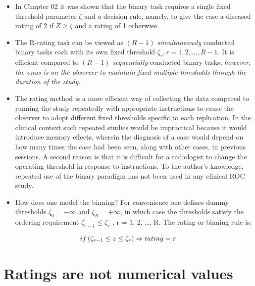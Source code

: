 \documentclass[
]{book}
\begin{document}
\begin{itemize}
\item
  In Chapter 02 it was shown that the binary task requires a single fixed threshold parameter \(\zeta\) and a decision rule, namely, to give the case a diseased rating of 2 if \(Z \ge \zeta\) and a rating of 1 otherwise.
\item
  The R-rating task can be viewed as \((R-1)\) \emph{simultaneously} conducted binary tasks each with its own fixed threshold \(\zeta_r, r = 1, 2, ..., R-1\). It is efficient compared to \((R-1)\) \emph{sequentially} conducted binary tasks; \emph{however, the onus is on the observer to maintain fixed-multiple thresholds through the duration of the study}.
\item
  The rating method is a more efficient way of collecting the data compared to running the study repeatedly with appropriate instructions to cause the observer to adopt different fixed thresholds specific to each replication. In the clinical context such repeated studies would be impractical because it would introduce memory effects, wherein the diagnosis of a case would depend on how many times the case had been seen, along with other cases, in previous sessions. A second reason is that it is difficult for a radiologist to change the operating threshold in response to instructions. To the author's knowledge, repeated use of the binary paradigm has not been used in any clinical ROC study.
\item
  How does one model the binning? For convenience one defines dummy thresholds \(\zeta_0 = - \infty\) and \(\zeta_R = + \infty\), in which case the thresholds satisfy the ordering requirement \(\zeta_{r-1} \le \zeta_r\) , r = 1, 2, \ldots, R. The rating or binning rule is:
\end{itemize}

\begin{equation*} 
if \left (\zeta_{r-1} \le z \le \zeta_r  \right )\Rightarrow \text rating = r
\end{equation*}

\hypertarget{ratings-are-not-numerical-values}{%
\section{Ratings are not numerical values}\label{ratings-are-not-numerical-values}}
\end{document}
